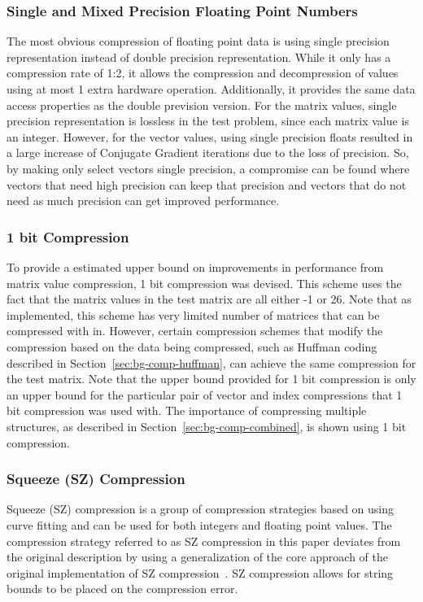 \subsubsection{Single and Mixed Precision Floating Point Numbers}
\label{sec:bg-comp-floatPrec}
The most obvious compression of floating point data is using single precision representation instead of double precision representation.
While it only has a compression rate of 1:2, it allows the compression and decompression of values using at most 1 extra hardware operation.
Additionally, it provides the same data access properties as the double prevision version.
For the matrix values, single precision representation is lossless in the test problem, since each matrix value is an integer.
However, for the vector values, using single precision floats resulted in a large increase of Conjugate Gradient iterations due to the loss of precision.
So, by making only select vectors single precision, a compromise can be found where vectors that need high precision can keep that precision and vectors that do not need as much precision can get improved performance.

\subsubsection{1 bit Compression}
\label{sec:bg-comp-1bit}
To provide a estimated upper bound on improvements in performance from matrix value compression, 1 bit compression was devised.
This scheme uses the fact that the matrix values in the test matrix are all either -1 or 26.
Note that as implemented, this scheme has very limited number of matrices that can be compressed with in.
However, certain compression schemes that modify the compression based on the data being compressed, such as Huffman coding described in Section~\ref{sec:bg-comp-huffman}, can achieve the same compression for the test matrix.
Note that the upper bound provided for 1 bit compression is only an upper bound for the particular pair of vector and index compressions that 1 bit compression was used with.
The importance of compressing multiple structures, as described in Section~\ref{sec:bg-comp-combined}, is shown using 1 bit compression.

\subsubsection{Squeeze (SZ) Compression}
\label{sec:bg-comp-sz}
Squeeze (SZ) compression is a group of compression strategies based on using curve fitting and can be used for both integers and floating point values.
The compression strategy referred to as SZ compression in this paper deviates from the original description by using a generalization of the core approach of the original implementation of SZ compression~\cite{Di:2016:SZ}.
SZ compression allows for string bounds to be placed on the compression error.

